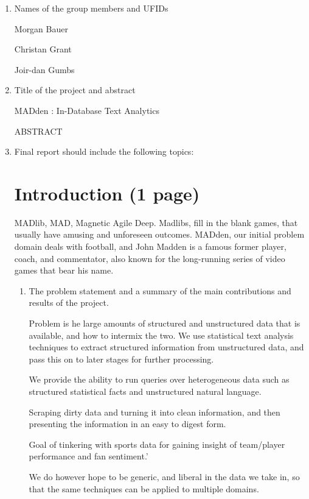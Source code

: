 \documentclass{article}
\begin{document}
\begin{enumerate}
\item Names of the group members and UFIDs


  Morgan Bauer

  Christan Grant

  Joir-dan Gumbs

\item Title of the project and abstract

  MADden : In-Database Text Analytics

  ABSTRACT



\item Final report should include the following topics:

  \section{Introduction (1 page)}

  MADlib, MAD, Magnetic Agile Deep.
  Madlibs, fill in the blank games, that usually have amusing and unforeseen outcomes.
  MADden, our initial problem domain deals with football,
  and John Madden is a famous former player, coach, and commentator,
  also known for the long-running series of video games that bear his name.

  \begin{enumerate}
  \item The problem statement and a summary of the main contributions and results of the project.

    Problem is he large amounts of structured and unstructured data that is available, and how to intermix the two.
    We use statistical text analysis techniques to extract structured information from unstructured data,
    and pass this on to later stages for further processing.

    We provide the ability to run queries over heterogeneous data such as structured statistical facts and unstructured natural language.

    Scraping dirty data and turning it into clean information, and then presenting the information in an easy to digest form.


    Goal of tinkering with sports data for gaining insight of team/player performance and fan sentiment.'

    We do however hope to be generic, and liberal in the data we take in, so that the same techniques can be applied to multiple domains.


\end{enumerate}
\end{enumerate}
\end{document}

